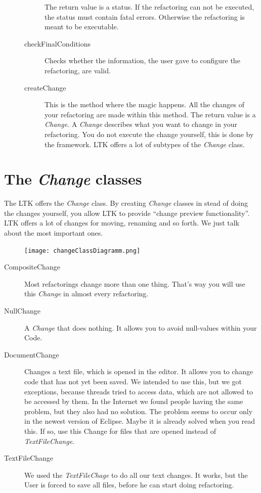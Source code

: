 \documentclass[a4paper,10pt]{report}
\begin{document}
\begin{description}
\begin{description}
The return value is a status. If the refactoring can not be executed, the status must contain fatal errors.
Otherwise the refactoring is meant to be executable.
\item[checkFinalConditions] Checks whether the information, the user gave to configure the refactoring, are valid. 
\item[createChange] This is the method where the magic happens. All the changes of your refactoring are made within this method.
The return value is a {\it Change}. A {\it Change} describes what you want to change in your refactoring.
You do not execute the change yourself, this is done by the framework. LTK offers a lot of subtypes of the {\it Change} class. 
\end{description}
\end{description}

\section{The {\it Change} classes}
The LTK offers the {\it Change} class. By creating {\it Change} classes in stead of doing the changes yourself, you allow LTK to provide ``change preview functionality''.
LTK offers a lot of changes for moving, renaming and so forth. We just talk about the most important ones.
\begin{figure}[h]
\centering
\texttt{[image: changeClassDiagramm.png]}
\end{figure}
\begin{description}
 \item[CompositeChange] Most refactorings change more than one thing. That's way you will use this {\it Change} in almost every refactoring.
 \item[NullChange] A {\it Change} that does nothing. It allows you to avoid null-values within your Code.
 \item[DocumentChange] Changes a text file, which is opened in the editor. It allows you to change code that has not yet been saved.
We intended to use this, but we got exceptions, because threads tried to access data, which are not allowed to be accessed by them.
In the Internet we found people having the same problem, but they also had no solution.
The problem seems to occur only in the newest version of Eclipse. Maybe it is already solved when you read this.
If so, use this Change for files that are opened instead of {\it TextFileChange}.
 \item[TextFileChange] We used the {\it TextFileChage} to do all our text changes. 
It works, but the User is forced to save all files, before he can start doing refactoring. 
\end{description}
\end{document}
